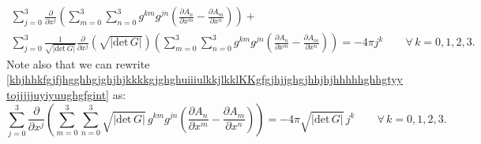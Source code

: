 \documentclass{article}
\theoremstyle{definition}
\theoremstyle{remark}
\newcommand{\er}{\eqref}
\newcommand{\er}{\eqref}
\begin{document}
\begin{multline}\label{khjhhkfgjfjhgghhgjghjhjkkkkgjghghuiiiulkkjlkklKKgfgjhjjghgjhhjhjhhhhhghhgtyytojjjjjuyiyuughgfgint}
\sum_{j=0}^{3}\frac{\partial}{\partial
x^j}\left(\sum_{m=0}^{3}\sum_{n=0}^{3}g^{km}g^{jn}\left(\frac{\partial
A_n}{\partial x^m}-\frac{\partial A_m}{\partial
x^n}\right)\right)+\\
\sum_{j=0}^{3}\frac{1}{\sqrt{|\text{det}\,G|}}\frac{\partial}{\partial
x^j}\left(\sqrt{|\text{det}\,G|}\right)\left(\sum_{m=0}^{3}\sum_{n=0}^{3}g^{km}g^{jn}\left(\frac{\partial
A_n}{\partial x^m}-\frac{\partial A_m}{\partial x^n}\right)\right)
=-4\pi j^k\quad\quad\forall\, k=0,1,2,3.
\end{multline}
Note also that we can rewrite
\er{khjhhkfgjfjhgghhgjghjhjkkkkgjghghuiiiulkkjlkklKKgfgjhjjghgjhhjhjhhhhhghhgtyytojjjjjuyiyuughgfgint}
as:
\begin{equation}\label{khjhhkfgjfjhgghhgjghjhjkkkkgjghghuiiiulkkjlkklKKgfgjhjjghgjhhjhjhhhhhghhgtyytojjjjjuyiyuughgfghhjint}
\sum_{j=0}^{3}\frac{\partial}{\partial
x^j}\left(\sum_{m=0}^{3}\sum_{n=0}^{3}\sqrt{|\text{det}\,G|}\,g^{km}g^{jn}\left(\frac{\partial
A_n}{\partial x^m}-\frac{\partial A_m}{\partial x^n}\right)\right)
=-4\pi \sqrt{|\text{det}\,G|}\, j^k\quad\quad\forall\, k=0,1,2,3.
\end{equation}
\end{document}

